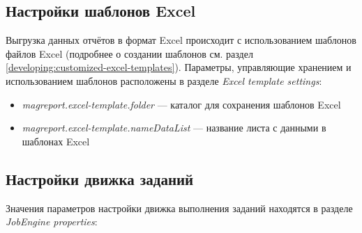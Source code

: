\documentclass[../user-manual.tex]{subfiles}
\begin{document}
	\subsection{Настройки шаблонов Excel}\label{subsection:excel-template-settings}
	
	Выгрузка данных отчётов в формат Excel происходит с использованием шаблонов файлов Excel (подробнее о создании шаблонов см. раздел \ref{developing:customized-excel-templates}). Параметры, управляющие хранением и использованием шаблонов расположены в разделе \textit{Excel template settings}:
	
	\begin{itemize}
		\item \textit{magreport.excel-template.folder} --- каталог для сохранения шаблонов Excel
		
		\item \textit{magreport.excel-template.nameDataList} --- название листа с данными в шаблонах Excel
	\end{itemize}
	
	\subsection{Настройки движка заданий}
	
	Значения параметров настройки движка выполнения заданий находятся в разделе \textit{JobEngine properties}:
	
\end{document}
